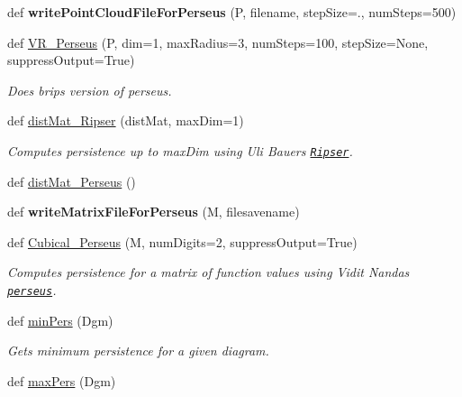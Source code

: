\begin{DoxyCompactItemize}
def {\bfseries write\+Point\+Cloud\+File\+For\+Perseus} (P, filename, step\+Size=., num\+Steps=500)
\item
def \hyperlink{namespaceteaspoon_1_1_t_d_a_1_1_persistence_ae3954f45636c5f88b8e7cb7b422eea3d}{V\+R\+\_\+\+Perseus} (P, dim=1, max\+Radius=3, num\+Steps=100, step\+Size=None, suppress\+Output=True)
\begin{DoxyCompactList}\small\item\em Does brips version of perseus. \end{DoxyCompactList}\item
def \hyperlink{namespaceteaspoon_1_1_t_d_a_1_1_persistence_a5d253547a9b956b8d5169808f31b42d2}{dist\+Mat\+\_\+\+Ripser} (dist\+Mat, max\+Dim=1)
\begin{DoxyCompactList}\small\item\em Computes persistence up to max\+Dim using Uli Bauer\textquotesingle{}s \href{https://github.com/Ripser/ripser}{\tt Ripser}. \end{DoxyCompactList}\item
def \hyperlink{namespaceteaspoon_1_1_t_d_a_1_1_persistence_a0660fcd00ca57001f21bfaaefb1da9c3}{dist\+Mat\+\_\+\+Perseus} ()
\item
\mbox{\label{namespaceteaspoon_1_1_t_d_a_1_1_persistence_a7ee47776929d1ade75b059415918a328}}
def {\bfseries write\+Matrix\+File\+For\+Perseus} (M, filesavename)
\item
def \hyperlink{namespaceteaspoon_1_1_t_d_a_1_1_persistence_aa583aa9a694aeaa3983e77319ac68e84}{Cubical\+\_\+\+Perseus} (M, num\+Digits=2, suppress\+Output=True)
\begin{DoxyCompactList}\small\item\em Computes persistence for a matrix of function values using Vidit Nanda\textquotesingle{}s \href{http://people.maths.ox.ac.uk/nanda/perseus/index.html}{\tt perseus}. \end{DoxyCompactList}\item
def \hyperlink{namespaceteaspoon_1_1_t_d_a_1_1_persistence_aadc062063e1ed3050361dba5c7d47a0f}{min\+Pers} (Dgm)
\begin{DoxyCompactList}\small\item\em Gets minimum persistence for a given diagram. \end{DoxyCompactList}\item
def \hyperlink{namespaceteaspoon_1_1_t_d_a_1_1_persistence_aff5b752e3141736e91e1386d28b3dfd5}{max\+Pers} (Dgm)

\end{DoxyCompactItemize}
